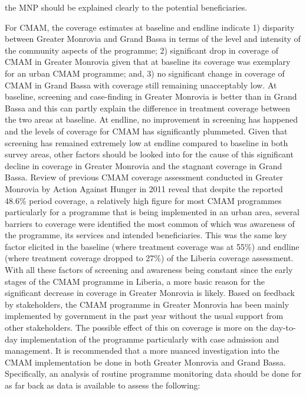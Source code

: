 \documentclass[12pt,a4paper]{article}
\begin{document}
the MNP should be explained clearly to the potential beneficiaries.

For CMAM, the coverage estimates at baseline and endline indicate 1) disparity between Greater Monrovia and Grand Bassa in terms of the level and intensity of the community aspects of the programme; 2) significant drop in coverage of CMAM in Greater Monrovia given that at baseline its coverage was exemplary for an urban CMAM programme; and, 3) no significant change in coverage of CMAM in Grand Bassa with coverage still remaining unacceptably low. At baseline, screening and case-finding in Greater Monrovia is better than in Grand Bassa and this can partly explain the difference in treatment coverage between the two areas at baseline. At endline, no improvement in screening has happened and the levels of coverage for CMAM has significantly plummeted. Given that screening has remained extremely low at endline compared to baseline in both survey areas, other factors should be looked into for the cause of this significant decline in coverage in Greater Monrovia and the stagnant coverage in Grand Bassa. Review of previous CMAM coverage assessment conducted in Greater Monrovia by Action Against Hunger in 2011 \citep{AccionContralaFaim:2011vu} reveal that despite the reported 48.6\% period coverage, a relatively high figure for most CMAM programmes particularly for a programme that is being implemented in an urban area, several barriers to coverage were identified the most common of which was awareness of the programme, its services and intended beneficiaries. This was the same key factor elicited in the baseline (where treatment coverage was at 55\%) and endline (where treatment coverage dropped to 27\%) of the Liberia coverage assessment. With all these factors of screening and awareness being constant since the early stages of the CMAM programme in Liberia, a more basic reason for the significant decrease in coverage in Greater Monrovia is likely. Based on feedback by stakeholders, the CMAM programme in Greater Monrovia has been mainly implemented by government in the past year without the usual support from other stakeholders. The possible effect of this on coverage is more on the day-to-day implementation of the programme particularly with case admission and management. It is recommended that a more nuanced investigation into the CMAM implementation be done in both Greater Monrovia and Grand Bassa. Specifically, an analysis of routine programme monitoring data should be done for as far back as data is available to assess the following:
\end{document}
